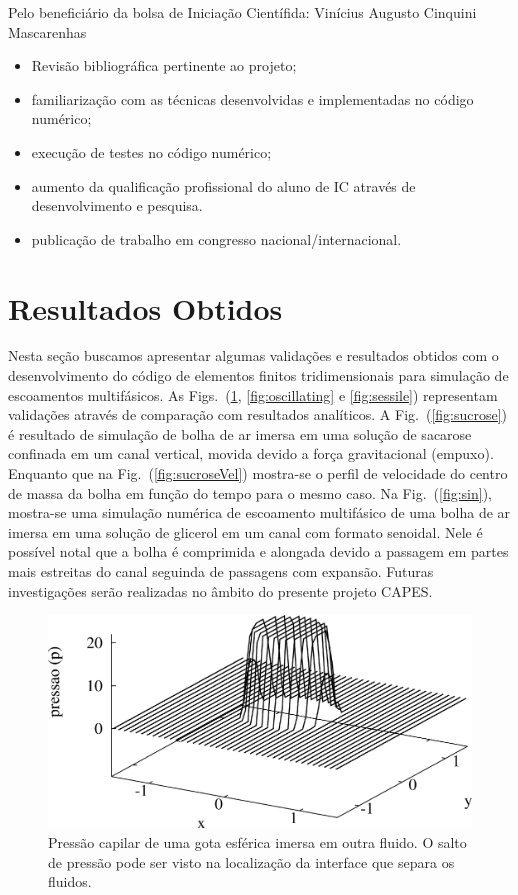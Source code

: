\documentclass[a4paper,portuges]{article}
\begin{document}
Pelo beneficiário da bolsa de Iniciação Científida: Vinícius Augusto Cinquini Mascarenhas
\begin{itemize}
\item Revisão bibliográfica pertinente ao projeto;
\item familiarização com as técnicas desenvolvidas e implementadas no
código numérico;
\item execução de testes no código numérico;
\item aumento da qualificação profissional do aluno de IC através de
desenvolvimento e pesquisa.
\item publicação de trabalho em congresso nacional/internacional.
\end{itemize}

\section{Resultados Obtidos}

Nesta seção buscamos apresentar algumas validações e resultados obtidos
com o desenvolvimento do código de elementos finitos tridimensionais
para simulação de escoamentos multifásicos. As
Figs.~(\ref{fig:pressure3d}, \ref{fig:oscillating} e \ref{fig:sessile})
representam validações através de comparação com resultados analíticos.
A Fig.~(\ref{fig:sucrose}) é resultado de simulação de bolha de ar
imersa em uma solução de sacarose confinada em um canal vertical, movida
devido a força gravitacional (empuxo). Enquanto que na
Fig.~(\ref{fig:sucroseVel}) mostra-se o perfil de velocidade do centro
de massa da bolha em função do tempo para o mesmo caso. Na
Fig.~(\ref{fig:sin}), mostra-se uma simulação numérica de escoamento
multifásico de uma bolha de ar imersa em uma solução de glicerol em um
canal com formato senoidal. Nele é possível notal que a bolha é
comprimida e alongada devido a passagem em partes mais estreitas do
canal seguinda de passagens com expansão. Futuras investigações serão
realizadas no âmbito do presente projeto CAPES.

 \begin{figure}[ht!]
 	\begin{center}
 		\includegraphics[angle=0, scale=0.5]{figs/pressure3d.pdf}
 	\end{center}
 	\caption{Pressão capilar de uma gota esférica imersa em outra fluido. 
	O salto de pressão pode ser visto na localização da interface que
	separa os fluidos.}
 	\label{fig:pressure3d} 
 \end{figure}
\end{document}
